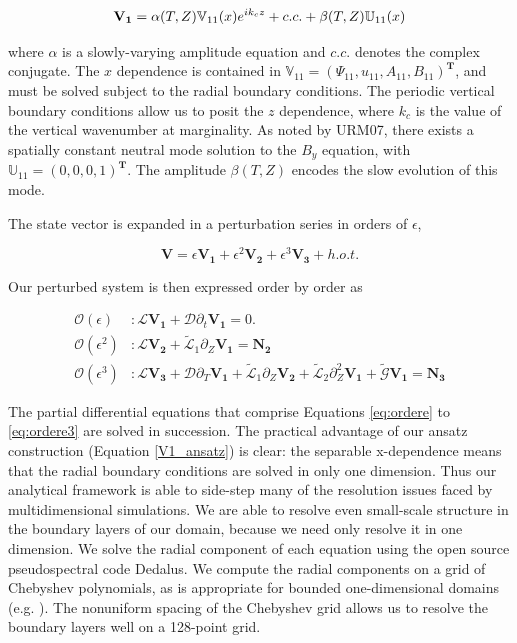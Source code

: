 \documentclass{emulateapj}
\newcommand{\beq}{\begin{equation}}
\newcommand{\eeq}{\end{equation}}
\newcommand{\citei}[1]{\citeauthor{#1} \citeyear{#1}}
\begin{document}
\beq
\label{V1_ansatz}
\mathbf{V_1} = \alpha(T, Z) \mathbb{V}_{11}(x) e^{i k_c z} + c.c. + \beta(T, Z)\mathbb{U}_{11}(x)\\
\eeq

where $\alpha$ is a slowly-varying amplitude equation and $c.c.$ denotes the complex conjugate. The $x$ dependence is contained in $\mathbb{V}_{11} = (\Psi_{11}, u_{11}, A_{11}, B_{11})^\mathbf{T}$, and must be solved subject to the radial boundary conditions. The periodic vertical boundary conditions allow us to posit the $z$ dependence, where $k_c$ is the value of the vertical wavenumber at marginality. As noted by URM07, there exists a spatially constant neutral mode solution to the $B_y$ equation, with $\mathbb{U}_{11} = (0, 0, 0, 1)^\mathbf{T}$. The amplitude $\beta(T, Z)$ encodes the slow evolution of this mode.

The state vector is expanded in a perturbation series in orders of $\epsilon$,

\beq
\label{eq:pert_exp}
\mathbf{V} = \epsilon\mathbf{V_1} + \epsilon^2\mathbf{V_2} + \epsilon^3\mathbf{V_3} + h.o.t.
\eeq

Our perturbed system is then expressed order by order as

\begin{align}
\mathcal{O}(\epsilon)&: \mathcal{L}\mathbf{V_1} + \mathcal{D}\partial_t \mathbf{V_1} = 0. \label{eq:ordere}\\
\mathcal{O}(\epsilon^2)&: \mathcal{L}\mathbf{V_2} + \widetilde{\mathcal{L}}_1 \partial_Z \mathbf{V_1} = \mathbf{N_2} \label{eq:ordere2}\\
\mathcal{O}(\epsilon^3)&: \mathcal{L} \mathbf{V_3} + \mathcal{D}\partial_T \mathbf{V_1}  + \widetilde{\mathcal{L}}_1\partial_Z\mathbf{V_2} + \widetilde{\mathcal{L}}_2\partial_Z^2\mathbf{V_1} + \widetilde{\mathcal{G}}\mathbf{V_1} = \mathbf{N_3} \label{eq:ordere3}
\end{align}

The partial differential equations that comprise Equations \ref{eq:ordere} to \ref{eq:ordere3} are solved in succession. The practical advantage of our ansatz construction (Equation \ref{V1_ansatz}) is clear: the separable x-dependence means that the radial boundary conditions are solved in only one dimension. Thus our analytical framework is able to side-step many of the resolution issues faced by multidimensional simulations. We are able to resolve even small-scale structure in the boundary layers of our domain, because we need only resolve it in one dimension. We solve the radial component of each equation using the open source pseudospectral code Dedalus. We compute the radial components on a grid of Chebyshev polynomials, as is appropriate for bounded one-dimensional domains (e.g. \citei{Boyd:2001aa}). The nonuniform spacing of the Chebyshev grid allows us to resolve the boundary layers well on a 128-point grid.
\end{document}
